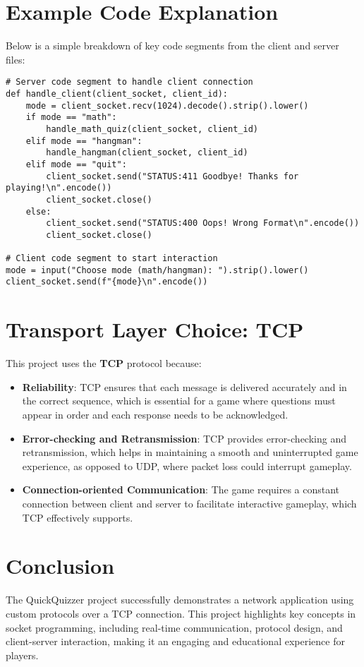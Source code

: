 \documentclass[12pt]{article}
\begin{document}
\newpage
\section{Example Code Explanation}
Below is a simple breakdown of key code segments from the client and server files:

\begin{verbatim}
# Server code segment to handle client connection
def handle_client(client_socket, client_id):
    mode = client_socket.recv(1024).decode().strip().lower()
    if mode == "math":
        handle_math_quiz(client_socket, client_id)
    elif mode == "hangman":
        handle_hangman(client_socket, client_id)
    elif mode == "quit":
        client_socket.send("STATUS:411 Goodbye! Thanks for playing!\n".encode())
        client_socket.close()
    else:
        client_socket.send("STATUS:400 Oops! Wrong Format\n".encode())
        client_socket.close()

# Client code segment to start interaction
mode = input("Choose mode (math/hangman): ").strip().lower()
client_socket.send(f"{mode}\n".encode())
\end{verbatim}

\section{Transport Layer Choice: TCP}
This project uses the \textbf{TCP} protocol because:
\begin{itemize}
    \item \textbf{Reliability}: TCP ensures that each message is delivered accurately and in the correct sequence, which is essential for a game where questions must appear in order and each response needs to be acknowledged.
    \item \textbf{Error-checking and Retransmission}: TCP provides error-checking and retransmission, which helps in maintaining a smooth and uninterrupted game experience, as opposed to UDP, where packet loss could interrupt gameplay.
    \item \textbf{Connection-oriented Communication}: The game requires a constant connection between client and server to facilitate interactive gameplay, which TCP effectively supports.
\end{itemize}

\section{Conclusion}
The QuickQuizzer project successfully demonstrates a network application using custom protocols over a TCP connection. This project highlights key concepts in socket programming, including real-time communication, protocol design, and client-server interaction, making it an engaging and educational experience for players.
\end{document}
